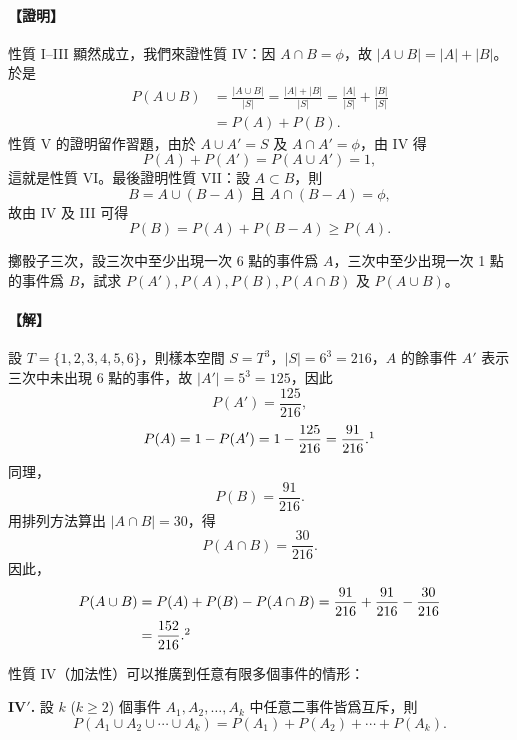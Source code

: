 \medskip
\paragraph{【證明】}
性質 I--III 顯然成立，我們來證性質 IV：因 $A \cap B = \phi$，故 $|A \cup B| = |A| + |B|$。於是
\begin{align*}
P(A \cup B) &= \frac{|A \cup B|}{|S|} = \frac{|A| + |B|}{|S|} = \frac{|A|}{|S|} + \frac{|B|}{|S|} \\
&= P(A) + P(B).
\end{align*}
性質 V 的證明留作習題，由於 $A \cup A' = S$ 及 $A \cap A' = \phi$，由 IV 得
\[
P(A) + P(A') = P(A \cup A') = 1,
\]
這就是性質 VI。最後證明性質 VII：設 $A \subset B$，則
\[
B = A \cup (B - A) \text{ 且 } A \cap (B - A) = \phi,
\]
故由 IV 及 III 可得
\[
P(B) = P(A) + P(B - A) \ge P(A). \tag*{\#}
\]

\medskip
\begin{discussion}\label{disc:b5-3-2}
擲骰子三次，設三次中至少出現一次 6 點的事件爲 $A$，三次中至少出現一次 1 點的事件爲 $B$，試求 $P(A'), P(A), P(B), P(A \cap B)$ 及 $P(A \cup B)$。
\end{discussion}
\paragraph{【解】}
設 $T=\{1, 2, 3, 4, 5, 6\}$，則樣本空間 $S=T^3$，$|S|=6^3=216$，$A$ 的餘事件 $A'$ 表示三次中未出現 6 點的事件，故 $|A'|=5^3=125$，因此
\[
P(A') = \frac{125}{216},
\]
\[
P(A) = 1 - P(A') = 1 - \frac{125}{216} = \frac{91}{216}.\footnotemark
\]
\label{note:b5-ch3-p99-pa}
同理，
\[
P(B) = \frac{91}{216}.
\]
用排列方法算出 $|A \cap B| = 30$，得
\[
P(A \cap B) = \frac{30}{216}.
\]
因此，
\begin{align*}
P(A \cup B) &= P(A) + P(B) - P(A \cap B) = \frac{91}{216} + \frac{91}{216} - \frac{30}{216} \\
&= \frac{152}{216}.\footnotemark
\end{align*}
\label{note:b5-ch3-p100-152}

性質 IV（加法性）可以推廣到任意有限多個事件的情形：

\medskip
\noindent\textbf{IV$'$.} 設 $k$ ($k \ge 2$) 個事件 $A_1, A_2, \dots, A_k$ 中任意二事件皆爲互斥，則
\[
P(A_1 \cup A_2 \cup \cdots \cup A_k) = P(A_1) + P(A_2) + \cdots + P(A_k).
\]


